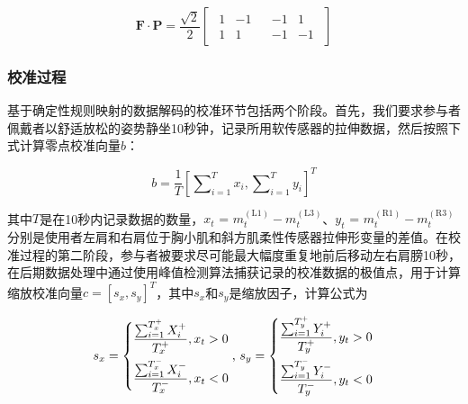 \[{\mathbf{F}} \cdot {\mathbf{P}} = \frac{{\sqrt 2 }}{2}\left[ {\begin{array}{*{20}{c}}
{\begin{array}{*{20}{c}}
1&{ - 1}  \\  
1&1 
\end{array}}&{\begin{array}{*{20}{c}}
{ - 1}&1  \\  
{ - 1}&{ - 1} 
\end{array}} 
\end{array}} \right]\]   

\subsubsection{校准过程}
基于确定性规则映射的数据解码的校准环节包括两个阶段。首先，我们要求参与者佩戴者以舒适放松的姿势静坐10秒钟，记录所用软传感器的拉伸数据，然后按照下式计算零点校准向量$b$：

\begin{equation}
b = \frac{1}{T}{\left[ {\sum\nolimits_{i = 1}^T {{x_i}} ,\sum\nolimits_{i = 1}^T {{y_i}} } \right]^T}
\label{eq3}
\end{equation}    

其中$T$是在10秒内记录数据的数量，${x_t}{\text{ = }}m_t^{({\text{L}}1)} - m_t^{({\text{L}}3)}$、${y_t}{\text{ = }}m_t^{({\text{R}}1)} - m_t^{({\text{R}}3)}$分别是使用者左肩和右肩位于胸小肌和斜方肌柔性传感器拉伸形变量的差值。在校准过程的第二阶段，参与者被要求尽可能最大幅度重复地前后移动左右肩膀10秒，在后期数据处理中通过使用峰值检测算法捕获记录的校准数据的极值点，用于计算缩放校准向量$c = {[{s_x},{s_y}]^T}$，其中${s_x}$和${s_y}$是缩放因子，计算公式为

\begin{equation}
{s_x} = \left \{  \begin{gathered}
    \frac{{\sum\nolimits_{i = 1}^{T_x^ + } {X_i^ + } }}{{T_x^ + }},{x_t} > 0 \hfill  \\ 
    \frac{{\sum\nolimits_{i = 1}^{T_x^ - } {X_i^ - } }}{{T_x^ - }},{x_t} < 0 \hfill  \\  
  \end{gathered}  \right.{\text{, }}{s_y} = \left \{  \begin{gathered}
    \frac{{\sum\nolimits_{i = 1}^{T_y^ + } {Y_i^ + } }}{{T_y^ + }},{y_t} > 0 \hfill  \\ 
    \frac{{\sum\nolimits_{i = 1}^{T_y^ - } {Y_i^ - } }}{{T_y^ - }},{y_t} < 0 \hfill  \\  
  \end{gathered}  \right.
  \label{eq4}
\end{equation}    

